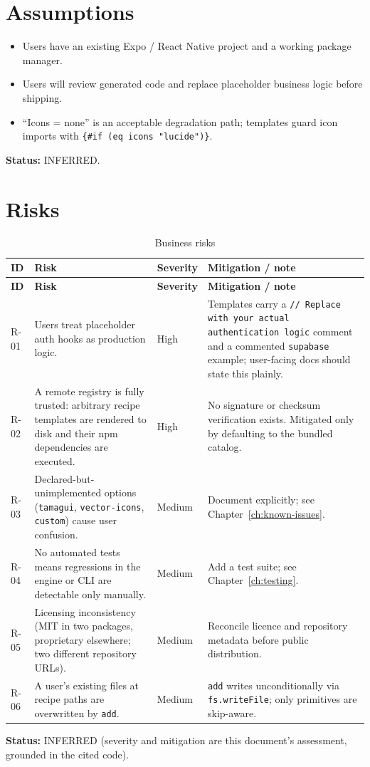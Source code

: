 \section{Assumptions}

\begin{itemize}
  \item Users have an existing Expo / React Native project and a working package
        manager.
  \item Users will review generated code and replace placeholder business logic
        before shipping.
  \item ``Icons = none'' is an acceptable degradation path; templates guard icon
        imports with \texttt{\{\#if (eq icons "lucide")\}}.
\end{itemize}

\textbf{Status:} INFERRED.

\section{Risks}

\begin{longtable}{@{}L{1.5cm}L{5.2cm}L{1.9cm}L{5.8cm}@{}}
\caption{Business risks}\\
\toprule
\textbf{ID} & \textbf{Risk} & \textbf{Severity} & \textbf{Mitigation / note} \\
\midrule
\endfirsthead
\toprule
\textbf{ID} & \textbf{Risk} & \textbf{Severity} & \textbf{Mitigation / note} \\
\midrule
\endhead
R-01 & Users treat placeholder auth hooks as production logic. & High & Templates carry a \texttt{// Replace with your actual authentication logic} comment and a commented \texttt{supabase} example; user-facing docs should state this plainly. \\
R-02 & A remote registry is fully trusted: arbitrary recipe templates are rendered to disk and their npm dependencies are executed. & High & No signature or checksum verification exists. Mitigated only by defaulting to the bundled catalog. \\
R-03 & Declared-but-unimplemented options (\texttt{tamagui}, \texttt{vector-icons}, \texttt{custom}) cause user confusion. & Medium & Document explicitly; see Chapter~\ref{ch:known-issues}. \\
R-04 & No automated tests means regressions in the engine or CLI are detectable only manually. & Medium & Add a test suite; see Chapter~\ref{ch:testing}. \\
R-05 & Licensing inconsistency (MIT in two packages, proprietary elsewhere; two different repository URLs). & Medium & Reconcile licence and repository metadata before public distribution. \\
R-06 & A user's existing files at recipe paths are overwritten by \texttt{add}. & Medium & \texttt{add} writes unconditionally via \texttt{fs.writeFile}; only primitives are skip-aware. \\
\bottomrule
\end{longtable}

\textbf{Status:} INFERRED (severity and mitigation are this document's assessment,
grounded in the cited code).
